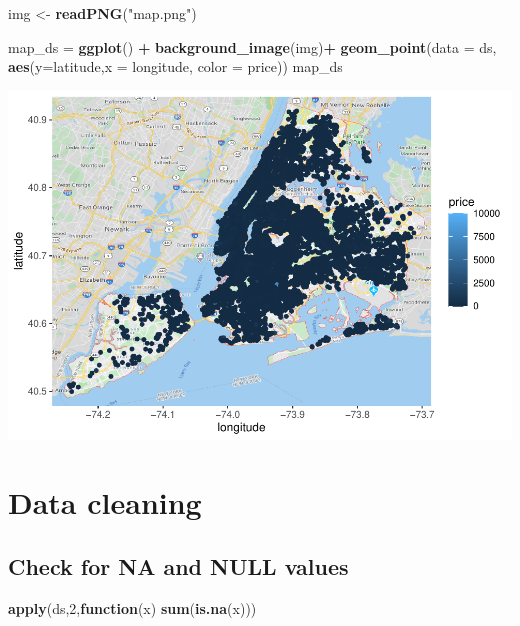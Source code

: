 \documentclass[
]{article}
\newenvironment{Shaded}{\begin{snugshade}}{\end{snugshade}}
\newcommand{\ControlFlowTok}[1]{\textcolor[rgb]{0.13,0.29,0.53}{\textbf{#1}}}
\newcommand{\DataTypeTok}[1]{\textcolor[rgb]{0.13,0.29,0.53}{#1}}
\newcommand{\DecValTok}[1]{\textcolor[rgb]{0.00,0.00,0.81}{#1}}
\newcommand{\KeywordTok}[1]{\textcolor[rgb]{0.13,0.29,0.53}{\textbf{#1}}}
\newcommand{\NormalTok}[1]{#1}
\newcommand{\OperatorTok}[1]{\textcolor[rgb]{0.81,0.36,0.00}{\textbf{#1}}}
\newcommand{\StringTok}[1]{\textcolor[rgb]{0.31,0.60,0.02}{#1}}
\begin{document}
\begin{Shaded}
\begin{Highlighting}[]
\NormalTok{img <-}\StringTok{ }\KeywordTok{readPNG}\NormalTok{(}\StringTok{"map.png"}\NormalTok{)}


\NormalTok{map_ds =}\StringTok{ }\KeywordTok{ggplot}\NormalTok{() }\OperatorTok{+}\StringTok{ }\KeywordTok{background_image}\NormalTok{(img)}\OperatorTok{+}\StringTok{ }\KeywordTok{geom_point}\NormalTok{(}\DataTypeTok{data =}\NormalTok{ ds,  }\KeywordTok{aes}\NormalTok{(}\DataTypeTok{y=}\NormalTok{latitude,}\DataTypeTok{x =}\NormalTok{ longitude, }\DataTypeTok{color =}\NormalTok{ price)) }
\NormalTok{map_ds}
\end{Highlighting}
\end{Shaded}

\includegraphics{project-code_files/figure-latex/unnamed-chunk-4-1.pdf}

\hypertarget{data-cleaning}{%
\section{Data cleaning}\label{data-cleaning}}

\hypertarget{check-for-na-and-null-values}{%
\subsection{Check for NA and NULL
values}\label{check-for-na-and-null-values}}

\begin{Shaded}
\begin{Highlighting}[]
\KeywordTok{apply}\NormalTok{(ds,}\DecValTok{2}\NormalTok{,}\ControlFlowTok{function}\NormalTok{(x) }\KeywordTok{sum}\NormalTok{(}\KeywordTok{is.na}\NormalTok{(x)))}
\end{Highlighting}
\end{Shaded}
\end{document}
